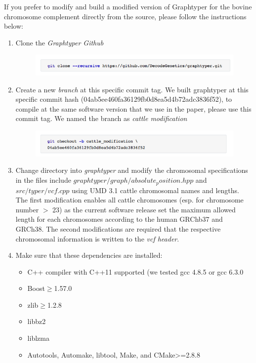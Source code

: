 \documentclass[../main.tex]{subfiles}
\begin{document}
\begin{flushleft}
If you prefer to modify and build a modified version of Graphtyper for the bovine chromosome
complement directly from the source, please follow the instructions below:

\begin{enumerate}
    \item Clone the \emph{Graphtyper Github}
    \begin{figure}[!htb]
        \centering
        \includegraphics[width=\textwidth]{paper1/supplement/sp13.png}
    \end{figure}

    \item Create a new \emph{branch} at this specific commit tag. We built graphtyper at this specific
    commit hash (04ab5ee460fa36129fb0d8ea5d4b72adc3836f52), to compile at the same
    software version that we use in the paper, please use this commit tag. We named the
    branch as \emph{cattle modification}

    \begin{figure}[!htb]
        \centering
        \includegraphics[width=\textwidth]{paper1/supplement/sp14.png}
    \end{figure}

    \item Change directory into \emph{graphtyper} and modify the chromosomal specifications in the files
    include $graphtyper/graph/absolute_position.hpp$ and $src/typer/vcf.cpp$ using UMD 3.1 cattle
    chromosomal names and lengths. The first modification enables all cattle chromosomes
    (esp. for chromosome number $>$ 23) as the current software release set the maximum
    allowed length for each chromosomes according to the human GRChb37 and GRCh38. The
    second modifications are required that the respective chromosomal information is written
    to the \emph{vcf header}.

    \item Make sure that these dependencies are installed:
    \begin{itemize}
        \item C++ compiler with C++11 supported (we tested gcc 4.8.5 or gcc 6.3.0 
        \item Boost$\geq$1.57.0
        \item zlib$\geq$1.2.8
        \item libbz2
        \item liblzma
        \item Autotools, Automake, libtool, Make, and CMake>=2.8.8
    \end{itemize}
    

\end{enumerate}
\end{flushleft}
\end{document}
